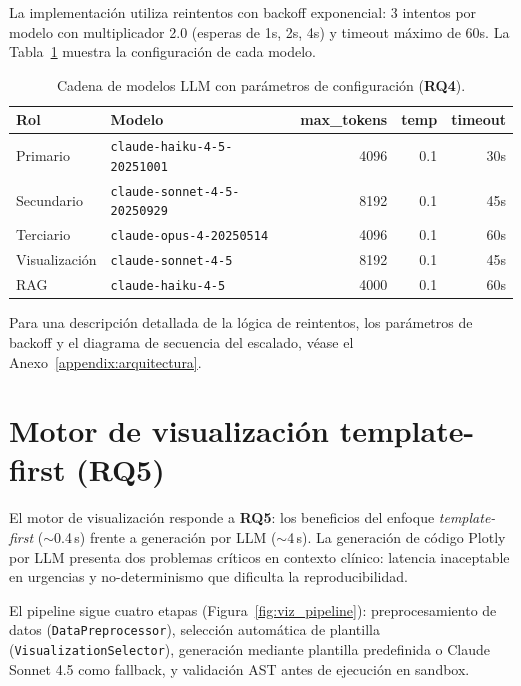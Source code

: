 La implementación utiliza reintentos con backoff exponencial: 3 intentos por modelo con multiplicador 2.0 (esperas de 1s, 2s, 4s) y timeout máximo de 60s. La Tabla~\ref{tab:models} muestra la configuración de cada modelo.

\begin{table}[H]
\centering
\caption{Cadena de modelos \acs{LLM} con parámetros de configuración (\textbf{RQ4}).}
\label{tab:models}
\footnotesize
\begin{tabularx}{\columnwidth}{llrrr}
\toprule
\textbf{Rol} & \textbf{Modelo} & \textbf{max\_tokens} & \textbf{temp} & \textbf{timeout} \\
\midrule
Primario & \texttt{claude-haiku-4-5-20251001} & 4096 & 0.1 & 30s \\
Secundario & \texttt{claude-sonnet-4-5-20250929} & 8192 & 0.1 & 45s \\
Terciario & \texttt{claude-opus-4-20250514} & 4096 & 0.1 & 60s \\
Visualización & \texttt{claude-sonnet-4-5} & 8192 & 0.1 & 45s \\
\ac{RAG} & \texttt{claude-haiku-4-5} & 4000 & 0.1 & 60s \\
\bottomrule
\end{tabularx}
\end{table}

Para una descripción detallada de la lógica de reintentos, los parámetros de backoff y el diagrama de secuencia del escalado, véase el Anexo~\ref{appendix:arquitectura}.

\section{Motor de visualización template-first (\acs{RQ}5)}
\label{sec:visualizacion}

El motor de visualización responde a \textbf{RQ5}: los beneficios del enfoque \textit{template-first} ($\sim$0.4\,s) frente a generación por \ac{LLM} ($\sim$4\,s). La generación de código Plotly por \ac{LLM} presenta dos problemas críticos en contexto clínico: latencia inaceptable en urgencias y no-determinismo que dificulta la reproducibilidad.

El pipeline sigue cuatro etapas (Figura~\ref{fig:viz_pipeline}): preprocesamiento de datos (\texttt{DataPreprocessor}), selección automática de plantilla (\texttt{VisualizationSelector}), generación mediante plantilla predefinida o Claude Sonnet 4.5 como fallback, y validación \ac{AST} antes de ejecución en sandbox.

